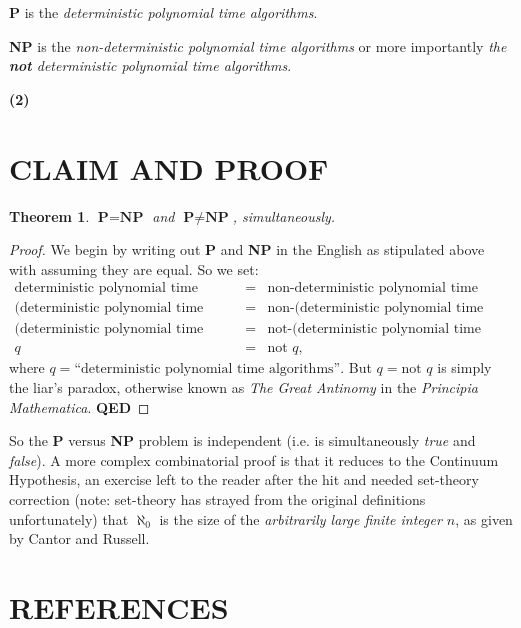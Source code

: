 \documentclass[11pt]{article}
\newtheorem*{theorem}{Theorem}
\begin{document}
    \textbf{P} is the \emph{deterministic polynomial time algorithms}.

    \textbf{NP} is the \emph{non-deterministic polynomial time algorithms} or more importantly
    \emph{the \textbf{not} deterministic polynomial time algorithms}.


    \textbf{(2)}
    \section*{CLAIM AND PROOF}
    \begin{theorem}
        $\textbf{P} = \textbf{NP}$ and $\textbf{P} \neq \textbf{NP}$, simultaneously.
    \end{theorem}

    \begin{proof}
        We begin by writing out \textbf{P} and \textbf{NP} in the English as stipulated above with assuming they are
        equal. So we set:
        \begin{eqnarray*}
            \text{deterministic polynomial time algorithms} & = & \text{non-deterministic polynomial time algorithms} \\
            \text{(deterministic polynomial time algorithms)} & = & \text{non-(deterministic polynomial time algorithms)} \\
            \text{(deterministic polynomial time algorithms)} & = & \text{not-(deterministic polynomial time algorithms)} \\
            q & = & \text{not } q,
        \end{eqnarray*}
        where $q=\text{``deterministic polynomial time algorithms''}$. But $q = \text{not } q$ is simply the liar's paradox,
        otherwise known as \emph{The Great Antinomy} in the \emph{Principia Mathematica}. \textbf{QED}
    \end{proof}

    So the \textbf{P} versus \textbf{NP} problem is independent (i.e. is simultaneously \emph{true} and \emph{false}).
    A more complex combinatorial proof is that it reduces to the Continuum Hypothesis, an exercise left to the reader
    after the hit and needed set-theory correction (note: set-theory has strayed from the original definitions unfortunately)
    that $\aleph_0$ is the size of the \emph{arbitrarily large finite integer $n$}, as given by Cantor and Russell.


    \clearpage
    \section*{REFERENCES}
\end{document}
